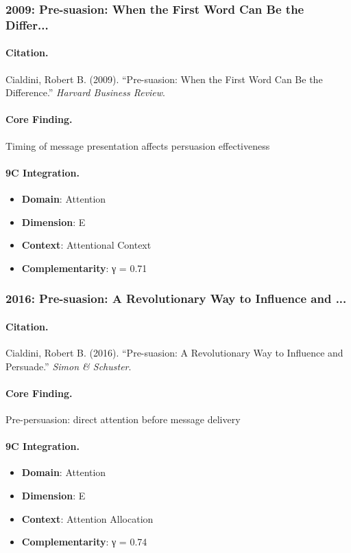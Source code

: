 \subsubsection{2009: Pre-suasion: When the First Word Can Be the Differ...}

\paragraph{Citation.}
Cialdini, Robert B. (2009). ``Pre-suasion: When the First Word Can Be the Difference.''
\textit{Harvard Business Review}.

\paragraph{Core Finding.}
Timing of message presentation affects persuasion effectiveness

\paragraph{9C Integration.}
\begin{itemize}[nosep]
  \item \textbf{Domain}: Attention
  \item \textbf{Dimension}: E
  \item \textbf{Context}: Attentional Context
  \item \textbf{Complementarity}: γ = 0.71
\end{itemize}

\subsubsection{2016: Pre-suasion: A Revolutionary Way to Influence and ...}

\paragraph{Citation.}
Cialdini, Robert B. (2016). ``Pre-suasion: A Revolutionary Way to Influence and Persuade.''
\textit{Simon & Schuster}.

\paragraph{Core Finding.}
Pre-persuasion: direct attention before message delivery

\paragraph{9C Integration.}
\begin{itemize}[nosep]
  \item \textbf{Domain}: Attention
  \item \textbf{Dimension}: E
  \item \textbf{Context}: Attention Allocation
  \item \textbf{Complementarity}: γ = 0.74
\end{itemize}

